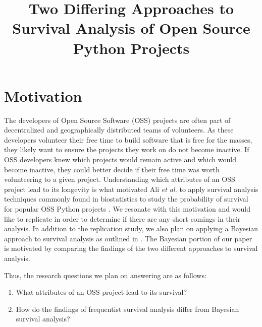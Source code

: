 \documentclass[conference]{IEEEtran}
\begin{document}


\title{Two Differing Approaches to Survival Analysis of Open Source Python Projects}

\author{
}

\maketitle

\section{Motivation}

The developers of Open Source Software (OSS) projects are often part of decentralized and geographically distributed teams of volunteers. As these developers volunteer their free time to build software that is free for the masses, they likely want to ensure the projects they work on do not become inactive. If OSS developers knew which projects would remain active and which would become inactive, they could better decide if their free time was worth volunteering to a given project. Understanding which attributes of an OSS project lead to its longevity is what motivated Ali \emph{et al.} to apply survival analysis techniques commonly found in biostatistics to study the probability of survival for popular OSS Python projects \cite{ali2020cheating}. We resonate with this motivation and would like to replicate \cite{ali2020cheating} in order to determine if there are any short comings in their analysis. In addition to the replication study, we also plan on applying a Bayesian approach to survival analysis as outlined in \cite{kelter2020bayesian}. The Bayesian portion of our paper is motivated by comparing the findings of the two different approaches to survival analysis.

Thus, the research questions we plan on answering are as follows:

\begin{enumerate}
    \item What attributes of an OSS project lead to its survival?
    \item How do the findings of frequentist survival analysis differ from Bayesian survival analysis?
\end{enumerate}
\end{document}

